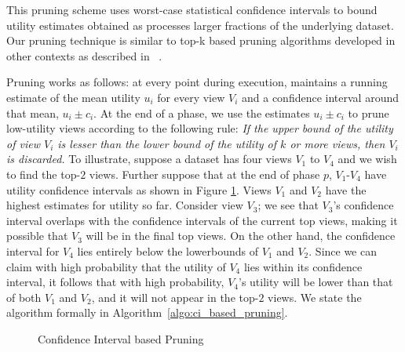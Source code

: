 \label{sec:confidence_interval}
This pruning scheme uses worst-case statistical confidence intervals to bound utility estimates obtained as \SeeDB
processes larger fractions of the underlying dataset.
Our pruning technique is similar to top-k based pruning 
algorithms developed 
in other contexts as described in ~\cite{DBLP:conf/pods/FaginLN01, 
DBLP:conf/vldb/IlyasAE04, DBLP:conf/ICDE/ReDS07}.

Pruning works as follows: at every point during execution, \SeeDB
maintains a running estimate of the mean utility $u_i$ for every view $V_i$ and a confidence interval around that mean, $u_i \pm c_i$.	
At the end of a phase, we use the estimates $u_i \pm c_i$ to prune low-utility views according to the following rule:
{\em If the upper bound of the utility of view $V_i$ is lesser
than the lower bound of the utility of $k$ or more views, then $V_i$ is discarded.}
To illustrate, suppose a dataset has four views $V_1$ to $V_4$ and we wish to find the top-$2$ views.
Further suppose that at the end of phase $p$,
$V_1$-$V_4$ have utility confidence intervals as shown in Figure \ref{fig:conf_interval}.
Views $V_1$ and $V_2$ have the highest estimates for utility so far.
Consider view $V_3$; we see that $V_3$'s confidence interval overlaps with the
confidence intervals of the current top views, making it possible
that $V_3$ will be in the final top views. On the other hand, the confidence
interval for $V_4$ lies entirely below the lowerbounds of $V_1$ and $V_2$.
Since we can claim with high probability
that the utility of $V_4$ lies within its confidence interval, it follows that
with high probability, $V_4$'s utility will be lower than that of both $V_1$ and
$V_2$, and it will not appear in the top-$2$ views.
We state the algorithm formally in
Algorithm~\ref{algo:ci_based_pruning}.

\begin{figure}[h]
\vspace{-10pt}
\centerline{
\hbox{}}
\vspace{-20pt}
\caption{Confidence Interval based Pruning}
\label{fig:conf_interval}
\vspace{-15pt}
\end{figure}


